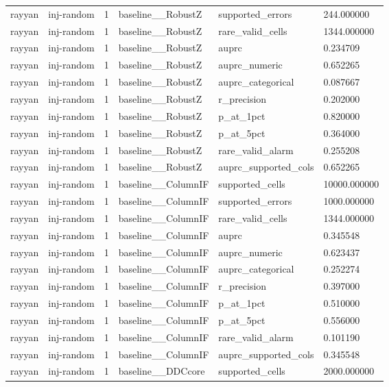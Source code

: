 \begin{tabular}{llllll}
rayyan & inj-random & 1 & baseline\_\_RobustZ & supported\_errors & 244.000000 \\
rayyan & inj-random & 1 & baseline\_\_RobustZ & rare\_valid\_cells & 1344.000000 \\
rayyan & inj-random & 1 & baseline\_\_RobustZ & auprc & 0.234709 \\
rayyan & inj-random & 1 & baseline\_\_RobustZ & auprc\_numeric & 0.652265 \\
rayyan & inj-random & 1 & baseline\_\_RobustZ & auprc\_categorical & 0.087667 \\
rayyan & inj-random & 1 & baseline\_\_RobustZ & r\_precision & 0.202000 \\
rayyan & inj-random & 1 & baseline\_\_RobustZ & p\_at\_1pct & 0.820000 \\
rayyan & inj-random & 1 & baseline\_\_RobustZ & p\_at\_5pct & 0.364000 \\
rayyan & inj-random & 1 & baseline\_\_RobustZ & rare\_valid\_alarm & 0.255208 \\
rayyan & inj-random & 1 & baseline\_\_RobustZ & auprc\_supported\_cols & 0.652265 \\
rayyan & inj-random & 1 & baseline\_\_ColumnIF & supported\_cells & 10000.000000 \\
rayyan & inj-random & 1 & baseline\_\_ColumnIF & supported\_errors & 1000.000000 \\
rayyan & inj-random & 1 & baseline\_\_ColumnIF & rare\_valid\_cells & 1344.000000 \\
rayyan & inj-random & 1 & baseline\_\_ColumnIF & auprc & 0.345548 \\
rayyan & inj-random & 1 & baseline\_\_ColumnIF & auprc\_numeric & 0.623437 \\
rayyan & inj-random & 1 & baseline\_\_ColumnIF & auprc\_categorical & 0.252274 \\
rayyan & inj-random & 1 & baseline\_\_ColumnIF & r\_precision & 0.397000 \\
rayyan & inj-random & 1 & baseline\_\_ColumnIF & p\_at\_1pct & 0.510000 \\
rayyan & inj-random & 1 & baseline\_\_ColumnIF & p\_at\_5pct & 0.556000 \\
rayyan & inj-random & 1 & baseline\_\_ColumnIF & rare\_valid\_alarm & 0.101190 \\
rayyan & inj-random & 1 & baseline\_\_ColumnIF & auprc\_supported\_cols & 0.345548 \\
rayyan & inj-random & 1 & baseline\_\_DDCcore & supported\_cells & 2000.000000 \\

\end{tabular}
